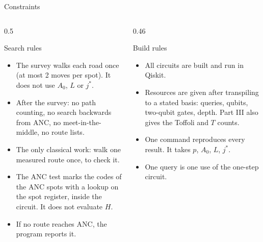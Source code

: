 \documentclass[aspectratio=169,10pt]{beamer}
\begin{document}
\begin{frame}{Constraints}
\begin{columns}[T]
\begin{column}{0.5\textwidth}
\begin{block}{Search rules}
\begin{itemize}\small
\item The survey walks each road once (at most 2 moves per spot). It does not use $A_0$, $L$ or $j^*$.
\item After the survey: no path counting, no search backwards from ANC, no meet-in-the-middle, no route lists.
\item The only classical work: walk one measured route once, to check it.
\item The ANC test marks the codes of the ANC spots with a lookup on the spot register, inside the circuit. It does not evaluate $H$.
\item If no route reaches ANC, the program reports it.
\end{itemize}
\end{block}
\end{column}
\begin{column}{0.46\textwidth}
\begin{block}{Build rules}
\begin{itemize}\small
\item All circuits are built and run in Qiskit.
\item Resources are given after transpiling to a stated basis: queries, qubits, two-qubit gates, depth. Part III also gives the Toffoli and $T$ counts.
\item One command reproduces every result. It takes $p$, $A_0$, $L$, $j^*$.
\item One query is one use of the one-step circuit.
\end{itemize}
\end{block}
\end{column}
\end{columns}
\end{frame}

\end{document}

